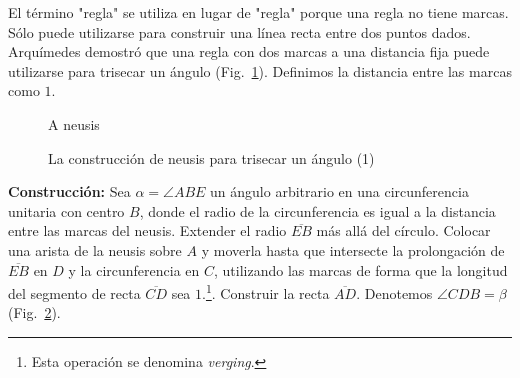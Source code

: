El término "regla" se utiliza en lugar de "regla" porque una regla no tiene marcas. Sólo puede utilizarse para construir una línea recta entre dos puntos dados. Arquímedes demostró que una regla con dos marcas a una distancia fija puede utilizarse para trisecar un ángulo (Fig.~\ref{f.neusis}). Definimos la distancia entre las marcas como $1$.

\begin{figure}[b]
\begin{center}
\end{center}
\caption{A neusis}\label{f.neusis}
\end{figure}

\begin{figure}[t]
\begin{center}
\end{center}
\caption{La construcción de neusis para trisecar un ángulo (1)}\label{f.trisect-neusis-1}
\end{figure}

\noindent\textbf{Construcción:}
Sea $\alpha=\angle ABE$ un ángulo arbitrario en una circunferencia unitaria con centro $B$, donde el radio de la circunferencia es igual a la distancia entre las marcas del neusis. Extender el radio $\overline{EB}$ más allá del círculo. Colocar una arista de la neusis sobre $A$ y moverla hasta que intersecte la prolongación de $\overline{EB}$ en $D$ y la circunferencia en $C$, utilizando las marcas de forma que la longitud del segmento de recta $\overline{CD}$ sea $1$.\footnote{Esta operación se denomina \emph{verging}.}. Construir la recta $\overline{AD}$. Denotemos $\angle CDB=\beta$ (Fig.~\ref{f.trisect-neusis-1}).

